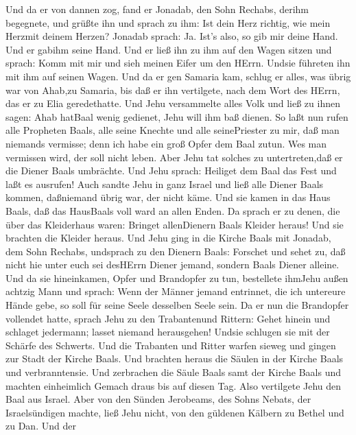 Und da er von dannen zog, fand er Jonadab, den Sohn Rechabs, derihm
begegnete, und grüßte ihn und sprach zu ihm: Ist dein Herz richtig, wie
mein Herzmit deinem Herzen? Jonadab sprach: Ja. Ist's also, so gib mir
deine Hand. Und er gabihm seine Hand. Und er ließ ihn zu ihm auf den
Wagen sitzen  und sprach: Komm mit mir und sieh meinen
Eifer um den HErrn. Undsie führeten ihn mit ihm auf seinen Wagen.
 Und da er gen Samaria kam, schlug er alles, was übrig war
von Ahab,zu Samaria, bis daß er ihn vertilgete, nach dem Wort des HErrn,
das er zu Elia geredethatte.  Und Jehu versammelte alles
Volk und ließ zu ihnen sagen: Ahab hatBaal wenig gedienet, Jehu will ihm
baß dienen.  So laßt nun rufen alle Propheten Baals, alle
seine Knechte und alle seinePriester zu mir, daß man niemands vermisse;
denn ich habe ein groß Opfer dem Baal zutun. Wes man vermissen wird, der
soll nicht leben. Aber Jehu tat solches zu untertreten,daß er die Diener
Baals umbrächte.  Und Jehu sprach: Heiliget dem Baal das
Fest und laßt es ausrufen!  Auch sandte Jehu in ganz Israel
und ließ alle Diener Baals kommen, daßniemand übrig war, der nicht käme.
Und sie kamen in das Haus Baals, daß das HausBaals voll ward an allen
Enden.  Da sprach er zu denen, die über das Kleiderhaus
waren: Bringet allenDienern Baals Kleider heraus! Und sie brachten die
Kleider heraus.  Und Jehu ging in die Kirche Baals mit
Jonadab, dem Sohn Rechabs, undsprach zu den Dienern Baals: Forschet und
sehet zu, daß nicht hie unter euch sei desHErrn Diener jemand, sondern
Baals Diener alleine.  Und da sie hineinkamen, Opfer und
Brandopfer zu tun, bestellete ihmJehu außen achtzig Mann und sprach:
Wenn der Männer jemand entrinnet, die ich untereure Hände gebe, so soll
für seine Seele desselben Seele sein.  Da er nun die
Brandopfer vollendet hatte, sprach Jehu zu den Trabantenund Rittern:
Gehet hinein und schlaget jedermann; lasset niemand herausgehen! Undsie
schlugen sie mit der Schärfe des Schwerts. Und die Trabanten und Ritter
warfen sieweg und gingen zur Stadt der Kirche Baals.  Und
brachten heraus die Säulen in der Kirche Baals und verbranntensie.
 Und zerbrachen die Säule Baals samt der Kirche Baals und
machten einheimlich Gemach draus bis auf diesen Tag.  Also
vertilgete Jehu den Baal aus Israel.  Aber von den Sünden
Jerobeams, des Sohns Nebats, der Israelsündigen machte, ließ Jehu nicht,
von den güldenen Kälbern zu Bethel und zu Dan.  Und der
